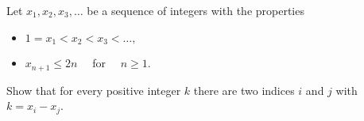 Let $x_1 , x_2 , x_3 , \ldots$ be a sequence of integers with the properties
\begin{itemize}
    \item $1 = x_1 < x_2 < x_3 < \ldots,$
    \item $x_{n+1}\leq 2n \quad$ for $\quad n \geq 1.$
\end{itemize}
Show that for every positive integer $k$ there are two indices $i$ and $j$ with $k = x_i - x_j$.
